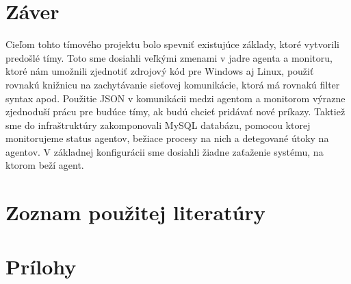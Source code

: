 \documentclass[a4paper,12pt]{article}
\begin{document}
\section*{Záver}
Cieľom tohto tímového projektu bolo spevniť existujúce základy, ktoré vytvorili predošlé tímy. Toto sme dosiahli veľkými zmenami v jadre agenta a monitoru, ktoré nám umožnili zjednotiť zdrojový kód pre Windows aj Linux, použiť rovnakú knižnicu na zachytávanie sieťovej komunikácie, ktorá má rovnakú filter syntax apod. Použitie JSON v komunikácii medzi agentom a monitorom výrazne zjednoduší prácu pre budúce tímy, ak budú chcieť pridávať nové príkazy. Taktiež sme do infraštruktúry zakomponovali MySQL databázu, pomocou ktorej monitorujeme status agentov, bežiace procesy na nich a detegované útoky na agentov. V základnej konfigurácii sme dosiahli žiadne zaťaženie systému, na ktorom beží agent. \\
\newpage

\section*{Zoznam použitej literatúry}

\newpage

\section*{Prílohy}

\newpage
\end{document}
